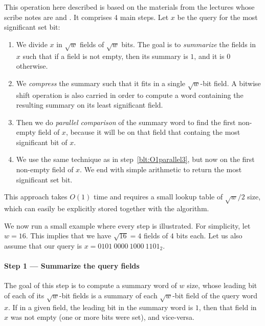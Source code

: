 This operation here described is based on the materials from the lectures whose scribe notes are \cite{nelsonjelanilec2} and \cite{erikdemainelec12}.
It comprises 4 main steps.
Let $x$ be the query for the most significant set bit:
\begin{enumerate}
    \item
    We divide $x$ in $\sqrt{w}$ fields of $\sqrt{w}$ bits. The goal is to \textit{summarize} the fields in $x$ such that if a field is not empty, then its summary is $1$, and it is $0$ otherwise.
    
    \item
    We \textit{compress} the summary such that it fits in a single $\sqrt{w}$-bit field. A bitwise shift operation is also carried in order to compute a word containing the resulting summary on its least significant field.
    
    \item \label{blt:O1parallel3}
    Then we do \textit{parallel comparison} of the summary word to find the first non-empty field of $x$, because it will be on that field that containg the most significant bit of $x$.
    
    \item
    We use the same technique as in step~\ref{blt:O1parallel3}, but now on the first non-empty field of $x$. We end with simple arithmetic to return the most significant set bit. 
\end{enumerate}

This approach takes $O(1)$ time and requires a small lookup table of $\sqrt{w}/2$ size, which can easily be explicitly stored together with the algorithm.

We now run a small example where every step is illustrated. For simplicity, let $w=16$. This implies that we have $\sqrt{16} = 4$ fields of $4$ bits each. Let us also assume that our query is $x = 0101\ 0000\ 1000\ 1101_2$.

\paragraph{Step 1 --- Summarize the query fields} \label{sec:summaryfields}

The goal of this step is to compute a summary word of $w$ size, whose leading bit of each of its $\sqrt{w}$-bit fields is a summary of each $\sqrt{w}$-bit field of the query word $x$. If in a given field, the leading bit in the summary word is $1$, then that field in $x$ was not empty (one or more bits were set), and vice-versa.

